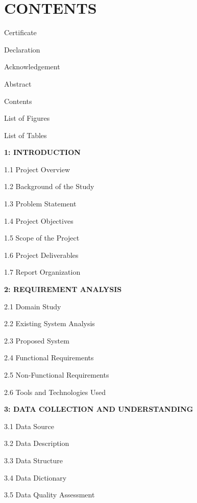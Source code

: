 \documentclass[12pt,a4paper]{report}
\begin{document}
\newpage

\chapter*{CONTENTS}

Certificate \dotfill

Declaration \dotfill

Acknowledgement \dotfill

Abstract \dotfill

Contents \dotfill

List of Figures \dotfill

List of Tables \dotfill

\vspace{0.3cm}

\textbf{1: INTRODUCTION} \dotfill

1.1 Project Overview \dotfill

1.2 Background of the Study \dotfill

1.3 Problem Statement \dotfill

1.4 Project Objectives \dotfill

1.5 Scope of the Project \dotfill

1.6 Project Deliverables \dotfill

1.7 Report Organization \dotfill

\vspace{0.3cm}

\textbf{2: REQUIREMENT ANALYSIS} \dotfill

2.1 Domain Study \dotfill

2.2 Existing System Analysis \dotfill

2.3 Proposed System \dotfill

2.4 Functional Requirements \dotfill

2.5 Non-Functional Requirements \dotfill

2.6 Tools and Technologies Used \dotfill

\vspace{0.3cm}

\textbf{3: DATA COLLECTION AND UNDERSTANDING} \dotfill

3.1 Data Source \dotfill

3.2 Data Description \dotfill

3.3 Data Structure \dotfill

3.4 Data Dictionary \dotfill

3.5 Data Quality Assessment \dotfill
\end{document}
